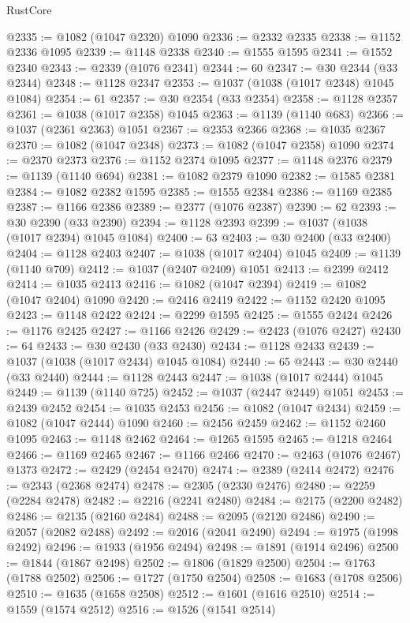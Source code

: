 \begin{lexlean}{RustCore}
\begin{coremodule}
@2335 := @1082 (@1047 @2320) @1090
@2336 := @2332 @2335
@2338 := @1152 @2336 @1095
@2339 := @1148 @2338
@2340 := @1555 @1595
@2341 := @1552 @2340
@2343 := @2339 (@1076 @2341)
@2344 := 60
@2347 := @30 @2344 (@33 @2344)
@2348 := @1128 @2347
@2353 := @1037 (@1038 (@1017 @2348) @1045 @1084)
@2354 := 61
@2357 := @30 @2354 (@33 @2354)
@2358 := @1128 @2357
@2361 := @1038 (@1017 @2358) @1045
@2363 := @1139 (@1140 @683)
@2366 := @1037 (@2361 @2363) @1051
@2367 := @2353 @2366
@2368 := @1035 @2367
@2370 := @1082 (@1047 @2348)
@2373 := @1082 (@1047 @2358) @1090
@2374 := @2370 @2373
@2376 := @1152 @2374 @1095
@2377 := @1148 @2376
@2379 := @1139 (@1140 @694)
@2381 := @1082 @2379 @1090
@2382 := @1585 @2381
@2384 := @1082 @2382 @1595
@2385 := @1555 @2384
@2386 := @1169 @2385
@2387 := @1166 @2386
@2389 := @2377 (@1076 @2387)
@2390 := 62
@2393 := @30 @2390 (@33 @2390)
@2394 := @1128 @2393
@2399 := @1037 (@1038 (@1017 @2394) @1045 @1084)
@2400 := 63
@2403 := @30 @2400 (@33 @2400)
@2404 := @1128 @2403
@2407 := @1038 (@1017 @2404) @1045
@2409 := @1139 (@1140 @709)
@2412 := @1037 (@2407 @2409) @1051
@2413 := @2399 @2412
@2414 := @1035 @2413
@2416 := @1082 (@1047 @2394)
@2419 := @1082 (@1047 @2404) @1090
@2420 := @2416 @2419
@2422 := @1152 @2420 @1095
@2423 := @1148 @2422
@2424 := @2299 @1595
@2425 := @1555 @2424
@2426 := @1176 @2425
@2427 := @1166 @2426
@2429 := @2423 (@1076 @2427)
@2430 := 64
@2433 := @30 @2430 (@33 @2430)
@2434 := @1128 @2433
@2439 := @1037 (@1038 (@1017 @2434) @1045 @1084)
@2440 := 65
@2443 := @30 @2440 (@33 @2440)
@2444 := @1128 @2443
@2447 := @1038 (@1017 @2444) @1045
@2449 := @1139 (@1140 @725)
@2452 := @1037 (@2447 @2449) @1051
@2453 := @2439 @2452
@2454 := @1035 @2453
@2456 := @1082 (@1047 @2434)
@2459 := @1082 (@1047 @2444) @1090
@2460 := @2456 @2459
@2462 := @1152 @2460 @1095
@2463 := @1148 @2462
@2464 := @1265 @1595
@2465 := @1218 @2464
@2466 := @1169 @2465
@2467 := @1166 @2466
@2470 := @2463 (@1076 @2467) @1373
@2472 := @2429 (@2454 @2470)
@2474 := @2389 (@2414 @2472)
@2476 := @2343 (@2368 @2474)
@2478 := @2305 (@2330 @2476)
@2480 := @2259 (@2284 @2478)
@2482 := @2216 (@2241 @2480)
@2484 := @2175 (@2200 @2482)
@2486 := @2135 (@2160 @2484)
@2488 := @2095 (@2120 @2486)
@2490 := @2057 (@2082 @2488)
@2492 := @2016 (@2041 @2490)
@2494 := @1975 (@1998 @2492)
@2496 := @1933 (@1956 @2494)
@2498 := @1891 (@1914 @2496)
@2500 := @1844 (@1867 @2498)
@2502 := @1806 (@1829 @2500)
@2504 := @1763 (@1788 @2502)
@2506 := @1727 (@1750 @2504)
@2508 := @1683 (@1708 @2506)
@2510 := @1635 (@1658 @2508)
@2512 := @1601 (@1616 @2510)
@2514 := @1559 (@1574 @2512)
@2516 := @1526 (@1541 @2514)

\end{coremodule}
\end{lexlean}
